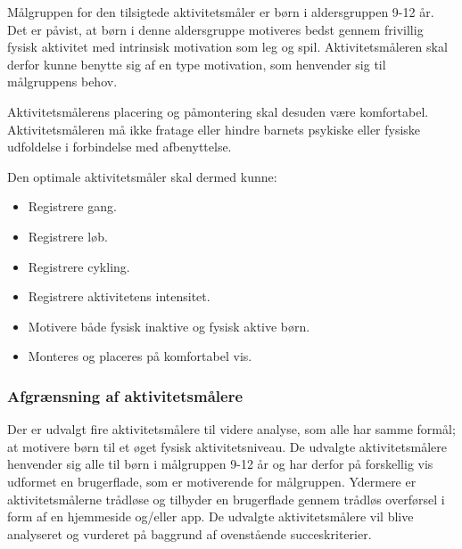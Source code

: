 Målgruppen for den tilsigtede aktivitetsmåler er børn i aldersgruppen 9-12 år. Det er påvist, at børn i denne aldersgruppe motiveres bedst gennem frivillig fysisk aktivitet med intrinsisk motivation som leg og spil. Aktivitetsmåleren skal derfor kunne benytte sig af en type motivation, som henvender sig til målgruppens behov.

Aktivitetsmålerens placering og påmontering skal desuden være komfortabel. Aktivitetsmåleren må ikke fratage eller hindre barnets psykiske eller fysiske udfoldelse i forbindelse med afbenyttelse. 

Den optimale aktivitetsmåler skal dermed kunne: 
\begin{itemize}
\item Registrere gang.
\item Registrere løb.
\item Registrere cykling. %
\item Registrere aktivitetens intensitet. %
\item Motivere både fysisk inaktive og fysisk aktive børn. %
\item Monteres og placeres på komfortabel vis.
\end{itemize}

\subsubsection{Afgrænsning af aktivitetsmålere}  %
Der er udvalgt fire aktivitetsmålere til videre analyse, som alle har samme formål; at motivere børn til et øget fysisk aktivitetsniveau. De udvalgte aktivitetsmålere henvender sig alle til børn i målgruppen 9-12 år og har derfor på forskellig vis udformet en brugerflade, som er motiverende for målgruppen. Ydermere er aktivitetsmålerne trådløse og tilbyder en brugerflade gennem trådløs overførsel i form af en hjemmeside og/eller app. \newline
De udvalgte aktivitetsmålere vil blive analyseret og vurderet på baggrund af ovenstående succeskriterier.

